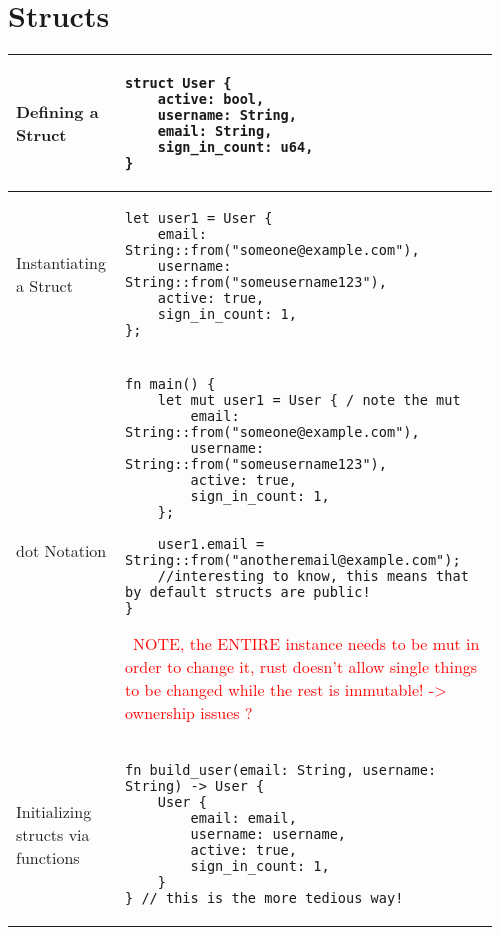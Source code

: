 \documentclass[main.tex,fontsize=8pt,paper=a4,paper=portrait,DIV=calc,]{scrartcl}
\begin{document}
\begin{table}[ht!]
\section{Structs}
\begin{tabular}{|m{0.2\linewidth}|m{0.755\linewidth}|}
\hline
Defining a Struct & 
\begin{lstlisting}
struct User {
    active: bool,
    username: String,
    email: String,
    sign_in_count: u64,
}
\end{lstlisting}\\
\hline
Instantiating a Struct & 
\begin{lstlisting}
let user1 = User {
    email: String::from("someone@example.com"),
    username: String::from("someusername123"),
    active: true,
    sign_in_count: 1,
};
\end{lstlisting}\\
\hline
dot Notation & 
\begin{lstlisting}
fn main() {
    let mut user1 = User { / note the mut
        email: String::from("someone@example.com"),
        username: String::from("someusername123"),
        active: true,
        sign_in_count: 1,
    };

    user1.email = String::from("anotheremail@example.com"); 
    //interesting to know, this means that by default structs are public!
}
\end{lstlisting}
\, \newline
\textcolor{red}{NOTE, the ENTIRE instance needs to be mut in order to change it, rust doesn't allow single things to be changed while the rest is immutable! -> ownership issues ?}\\
\hline
Initializing structs via functions & 
\begin{lstlisting}
fn build_user(email: String, username: String) -> User {
    User {
        email: email,
        username: username,
        active: true,
        sign_in_count: 1,
    }
} // this is the more tedious way!
\end{lstlisting}\\
\hline
\end{tabular}
\end{table}
\pagebreak
\end{document}
